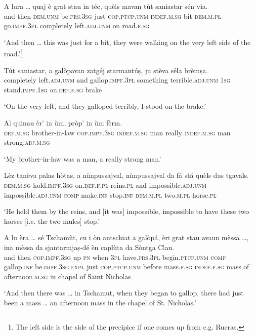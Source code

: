 \begin{linenumbers}
\gll A lura … quaj è grat stau in téc, quèls mavan tùt saniastar sén via.   \\
and then {} \textsc{dem.unm} be.\textsc{prs.3sg} just \textsc{cop.ptcp.unm} \textsc{indef.m.sg} bit \textsc{dem.m.pl} go.\textsc{impf.3pl} completely left.\textsc{adj.unm} on road.\textsc{f.sg}  \\
\end{linenumbers}
\medskip
\glt `And then … this was just for a bit, they were walking on the very left side of the road.'\footnote{The left side is the side of the precipice if one comes up from e.g. Rueras.}
\medskip

\begin{linenumbers}
\gll  Tùt saniastar, a galòpavan zatgéj starmantúṣ, ju stèva séla brèmṣa.  \\
 completely left.\textsc{adj.unm} and gallop.\textsc{impf.3pl} something terrible.\textsc{adj.unm} \textsc{1sg} stand.\textsc{impf.1sg} on.\textsc{def.f.sg} brake\\
\end{linenumbers}
\medskip
\glt `On the very left, and they galloped terribly, I stood on the brake.'
\medskip

\begin{linenumbers}
\gll   Al quinau èr’ in ùm, pròp’ in ùm fèrm. \\
 \textsc{def.m.sg} brother-in-law \textsc{cop.impf.3sg} \textsc{indef.m.sg} man really \textsc{indef.m.sg} man strong.\textsc{adj.m.sg}  \\
\end{linenumbers}
\medskip
\glt `My brother-in-law was a man, a really strong man.'
\medskip

\begin{linenumbers}
\gll  Lèz tanèva palas hòtas, a nùnpussajval, nùnpussajval da fá stá quèls dus tgavals.  \\
 \textsc{dem.m.sg} hold.\textsc{impf.3sg} on.\textsc{def.f.pl} reins.\textsc{pl} and  impossible.\textsc{adj.unm} impossible.\textsc{adj.unm} \textsc{comp} make.\textsc{inf} stop.\textsc{inf}  \textsc{dem.m.pl} two.\textsc{m.pl} horse.\textsc{pl} \\
\end{linenumbers}
\medskip
\glt `He held them by the reins, and [it was] impossible, impossible to have these two horses [i.e. the two mules] stop.'
\medskip

\begin{linenumbers}
\gll  A lu èra … sé Tschamùt, cu i òn antschiat a galòpá, èri grat stau avaun mèssa …, ina mèssa da sjantarmjaṣ-dé èn caplùta da Sòntga Clau.\\
and then \textsc{cop.impf.3sg} {} up \textsc{pn} when \textsc{3pl} have.\textsc{prs.3pl} begin.\textsc{ptcp.unm} \textsc{comp} gallop.\textsc{inf} be.\textsc{impf.3sg.expl} just  \textsc{cop.ptcp.unm} before mass.\textsc{f.sg} {} \textsc{indef.f.sg} mass of afternoon.\textsc{m.sg} in chapel of Saint Nicholas  \\
\end{linenumbers}
\medskip
\glt `And then there was … in Tschamut, when they began to gallop, there had just been a mass … an afternoon mass in the chapel of St. Nicholas.'
\medskip

